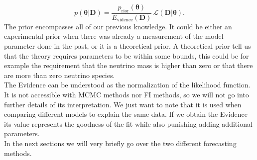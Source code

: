 \documentclass[oneside]{book}
\begin{document}
\begin{equation}
    p(\boldsymbol{\theta}|\boldsymbol{D}) = \frac{p_\mathrm{rior}(\boldsymbol{\theta})}{E_\mathrm{vidence}(\boldsymbol{D})}\,\mathcal{L}(\boldsymbol{D}|\boldsymbol{\theta}).
\end{equation}
The prior encompasses all of our previous knowledge. It could be either an experimental prior when there was already a measurement of the model parameter done in the past, or it is a theoretical prior. A theoretical prior tell us that the theory requires parameters to be within some bounds, this could be for example the requirement that the neutrino mass is higher than zero or that there are more than zero neutrino species.\\
The Evidence can be understood as the normalization of the likelihood function. It is not accessible with MCMC methods nor FI methods, so we will not go into further details of its  interpretation. We just want to note that it is used when comparing different models to explain the same data. If we obtain the Evidence its value represents the goodness of the fit while also punishing adding additional parameters.\\
In the next sections we will very briefly go over the two different forecasting methods.  
\end{document}
